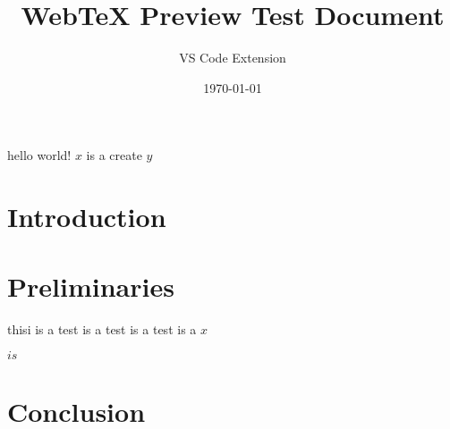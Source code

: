 \documentclass{article}
\title{WebTeX Preview Test Document}
\author{VS Code Extension}
\date{\today}
\begin{document}
\maketitle

hello world! $x$  is  a 
create $y$

\section{Introduction}

\section{Preliminaries}

\begin{prooftree}
\end{prooftree}

thisi is a test is a test is a test is  a $x$

$ is $

\section{Conclusion}
\end{document}
